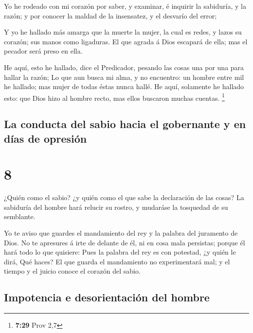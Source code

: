  Yo he rodeado con mi corazón por saber, y examinar, é
inquirir la sabiduría, y la razón; y por conocer la maldad de la
insensatez, y el desvarío del error;

 Y yo he hallado más amarga que la muerte la mujer, la
cual es redes, y lazos su corazón; sus manos como ligaduras. El que
agrada á Dios escapará de ella; mas el pecador será preso en ella.

 He aquí, esto he hallado, dice el Predicador, pesando
las cosas una por una para hallar la razón;  Lo que aun
busca mi alma, y no encuentro: un hombre entre mil he hallado; mas mujer
de todas éstas nunca hallé.  He aquí, solamente he
hallado esto: que Dios hizo al hombre recto, mas ellos buscaron muchas
cuentas. \footnote{\textbf{7:29} Prov 2,7}

\hypertarget{la-conducta-del-sabio-hacia-el-gobernante-y-en-duxedas-de-opresiuxf3n}{%
\subsection{La conducta del sabio hacia el gobernante y en días de
opresión}\label{la-conducta-del-sabio-hacia-el-gobernante-y-en-duxedas-de-opresiuxf3n}}

\hypertarget{section-7}{%
\section{8}\label{section-7}}

 ¿Quién como el sabio? ¿y quién como el que sabe la
declaración de las cosas? La sabiduría del hombre hará relucir su
rostro, y mudaráse la tosquedad de su semblante.

 Yo te aviso que guardes el mandamiento del rey y la
palabra del juramento de Dios.  No te apresures á irte de
delante de él, ni en cosa mala persistas; porque él hará todo lo que
quisiere:  Pues la palabra del rey es con potestad, ¿y
quién le dirá, Qué haces?  El que guarda el mandamiento no
experimentará mal; y el tiempo y el juicio conoce el corazón del sabio.

\hypertarget{impotencia-e-desorientaciuxf3n-del-hombre}{%
\subsection{Impotencia e desorientación del
hombre}\label{impotencia-e-desorientaciuxf3n-del-hombre}}

